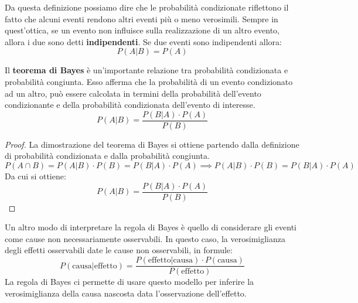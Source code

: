 Da questa definizione possiamo dire che le probabilità condizionate riflettono
il fatto che alcuni eventi rendono altri eventi più o meno verosimili. Sempre
in quest'ottica, se un evento non influisce sulla realizzazione di un altro
evento, allora i due sono detti \textbf{indipendenti}. Se due eventi sono
indipendenti allora:
\begin{equation}
    P(A | B) = P(A)
\end{equation}
\begin{definizione}
    Il \textbf{teorema di Bayes} è un'importante relazione tra probabilità
    condizionata e probabilità congiunta. Esso afferma che la probabilità di
    un evento condizionato ad un altro, può essere calcolata in termini
    della probabilità dell'evento condizionante e della probabilità
    condizionata dell'evento di interesse.
    \begin{equation}
        P(A|B) = \frac{P(B|A) \cdot P(A)}{P(B)}
    \end{equation}
    \begin{proof}
        La dimostrazione del teorema di Bayes si ottiene partendo dalla
        definizione di probabilità condizionata e dalla probabilità congiunta.
        \begin{equation*}
            P(A \cap B) = P(A|B) \cdot P(B) = P(B|A) \cdot P(A) \implies  P(A|B)
            \cdot P(B) = P(B|A) \cdot P(A)
        \end{equation*}
        Da cui si ottiene:
        \begin{equation*}
            P(A|B) = \frac{P(B|A) \cdot P(A)}{P(B)}
        \end{equation*}
    \end{proof}
\end{definizione}
Un altro modo di interpretare la regola di Bayes è quello di considerare
gli eventi come cause non necessariamente osservabili. In questo caso, la
verosimiglianza degli effetti osservabili date le cause non osservabili, in
formule:
\begin{equation*}
    P(\text{causa}|\text{effetto}) = \frac{P(\text{effetto}|\text{causa}) \cdot
        P(\text{causa})}{P(\text{effetto})}
\end{equation*}
La regola di Bayes ci permette di usare questo modello per inferire la
verosimiglianza della causa nascosta data l'osservazione dell'effetto.

